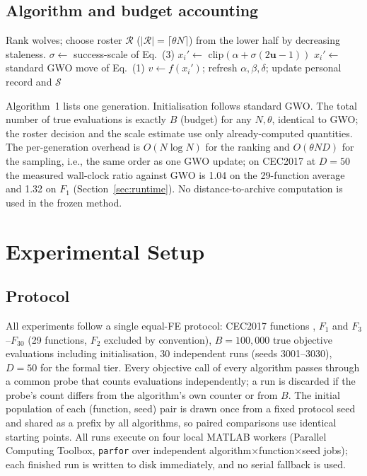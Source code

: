 \documentclass[journal]{IEEEtran}
\newcommand{\method}{DCS-GWO}
\begin{document}
\subsection{Algorithm and budget accounting}
\begin{algorithm}[t]
\caption{\method{} (one generation, $N$ true evaluations)}
\begin{algorithmic}[1]
\State Rank wolves; choose roster $\mathcal{R}$ ($|\mathcal{R}|=\lceil\theta N\rceil$) from the lower half by decreasing staleness.
\State $\sigma \gets$ success-scale of Eq.~(3)
    \State $x_i' \gets$ clip$(\alpha+\sigma(2\mathbf{u}-1))$ 
  \Else
    \State $x_i' \gets$ standard GWO move of Eq.~(1) 
  \EndIf
  \State $v \gets f(x_i')$; refresh $\alpha,\beta,\delta$; update personal record and $\mathcal{S}$
\EndFor
\end{algorithmic}
\end{algorithm}
Algorithm~1 lists one generation. Initialisation follows standard GWO. The
total number of true evaluations is exactly $B$ (budget) for any $N,\theta$,
identical to GWO; the roster decision and the scale estimate use only
already-computed quantities. The per-generation overhead is $O(N \log N)$ for
the ranking and $O(\theta N D)$ for the sampling, i.e., the same order as one
GWO update; on CEC2017 at $D=50$ the measured wall-clock ratio against GWO is
1.04 on the 29-function average and 1.32 on $F_1$ (Section~\ref{sec:runtime}). No distance-to-archive computation is
used in the frozen method.

\section{Experimental Setup}
\label{sec:experiments}
\subsection{Protocol}
All experiments follow a single equal-FE protocol: CEC2017 functions
\cite{awad2016cec2017}, $F_1$ and $F_3$--$F_{30}$ (29 functions, $F_2$
excluded by convention), $B=100{,}000$ true objective evaluations including
initialisation, 30 independent runs (seeds 3001--3030), $D=50$ for the
formal tier. Every objective call of every algorithm passes through a common
probe that counts evaluations independently; a run is discarded if the
probe's count differs from the algorithm's own counter or from $B$. The
initial population of each (function, seed) pair is drawn once from a fixed
protocol seed and shared as a prefix by all algorithms, so paired comparisons
use identical starting points. All runs execute on four local MATLAB workers
(Parallel Computing Toolbox, \texttt{parfor} over independent
algorithm$\times$function$\times$seed jobs); each finished run is written to
disk immediately, and no serial fallback is used.
\end{document}
